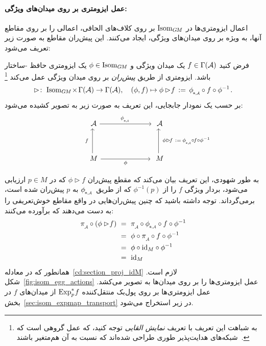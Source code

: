 \paragraph{عمل ایزومتری بر روی میدان‌های ویژگی:}
اعمال ایزومتری‌ها در $\operatorname{Isom}_{G\mkern-1.4muM}$ بر روی کلاف‌های الحاقی، اعمالی را بر روی مقاطع آنها، به ویژه بر روی میدان‌های ویژگی، ایجاد می‌کنند.
این پیش‌ران مقاطع به صورت زیر تعریف می‌شود:
\begin{dfn}
\label{dfn:isometry_pushforward}
    فرض کنید $f\in \Gamma(\mathcal{A})$ یک میدان ویژگی و $\phi\in \operatorname{Isom}_{G\mkern-1.4muM}$ یک ایزومتری حافظ -ساختار باشد.
    ایزومتری از طریق \emph{پیش‌ران} بر روی میدان ویژگی عمل می‌کند%
    \footnote{
        به شباهت این تعریف با تعریف \emph{نمایش القایی} توجه کنید، که عمل گروهی است که شبکه‌های  هدایت‌پذیر طوری طراحی شده‌اند که نسبت به آن هم‌متغیر باشند~\cite{Cohen2017-STEER,3d_steerableCNNs,Weiler2019_E2CNN}.
    }
    \begin{align}\label{eq:pushforward_section_A}
        \rhd\!:\ \IsomGM \mkern-2mu\times\mkern2mu \Gamma(\A) \to \Gamma(\A), \quad
        (\phi,f) \mapsto \phi\rhd\!f \,:=\, \dphiA\! \circ f \circ \phiinv \,.
    \end{align}
    بر حسب یک نمودار جابجایی، این تعریف به صورت زیر به تصویر کشیده می‌شود:
    \begin{equation}\label{cd:pushforward_section_A}
    \qquad\qquad
    \begin{tikzcd}[column sep=70pt, row sep=35, font=\normalsize]
        \A
            \arrow[r, "\dphiA"]
        &
        \A
        \\
        M
            \arrow[r, "\phi"']
            \arrow[u, "f\ "]
        &
        M
            \arrow[u, "\ \phi\rhd\!f\ :=\: \dphiA \!\circ\mkern-2mu f \circ \phiinv"']
    \end{tikzcd}
    \end{equation}
\end{dfn}
به طور شهودی، این تعریف بیان می‌کند که مقطع پیش‌ران $\phi\rhd\!f$ که در $p\in M$ ارزیابی می‌شود، بردار ویژگی $f$ را از $\phi^{-1}(p)$ که از طریق $\dphiA$ به $p$ پیش‌ران شده است، برمی‌گرداند.
توجه داشته باشید که چنین پیش‌ران‌هایی در واقع مقاطع خوش‌تعریفی را به دست می‌دهند که برآورده می‌کنند:
\begin{align}
    \piA \circ (\phi\rhd \!f)
    \ &=\ \piA \circ \dphiA\! \circ f \circ \phiinv \notag \\
    \ &=\ \phi \circ \piA \circ f \circ \phiinv \notag \\
    \ &=\ \phi \circ \id_M \circ \phiinv \notag \\
    \ &=\ \id_M
\end{align}
همانطور که در معادله~\eqref{cd:section_proj_idM} لازم است.
شکل~\ref{fig:isom_egg_actions} عمل ایزومتری‌ها را بر روی میدان‌ها به تصویر می‌کشد.
عمل ایزومتری‌ها بر روی پول‌بک منتقل‌کننده $\operatorname{Exp}^*_p\mkern-2mu f$ از میدان‌های $f$ در بخش~\ref{sec:isom_expmap_transport} در زیر استخراج می‌شود.


















